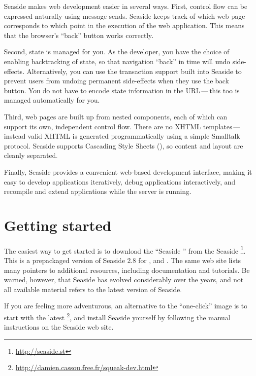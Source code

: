 \documentclass[a4paper,10pt,twoside]{book}
\begin{document}
Seaside makes web development easier in several ways.
First,  control flow can be expressed naturally using message sends.
Seaside keeps track of which web page corresponds to which point in the execution of the web application.
This means that the browser's ``back'' button works correctly.

Second, state is managed for you.
As the developer, you have the choice of enabling 
backtracking of state, so that navigation ``back'' in time will undo side-effects.
Alternatively, you can use the transaction support built into Seaside to prevent users from undoing permanent side-effects when they use the back button.
You do not have to encode state information in the URL\,---\,this too is managed automatically for you.

Third, web pages are built up from nested components, each of which can support its own, independent control flow.
There are no XHTML templates\,---\,instead valid XHTML is generated programmatically using a simple Smalltalk protocol.
Seaside supports Cascading Style Sheets (), so content and layout are cleanly separated.

Finally, Seaside provides a convenient web-based development interface, making it easy to develop applications iteratively, debug applications interactively, and recompile and extend applications while the server is running.

\section{Getting started}

The easiest way to get started is to download the ``Seaside '' from the Seaside \footnote{\url{http://seaside.st}}.
This is a prepackaged version of Seaside 2.8 for ,  and .
The same web site lists many pointers to additional resources, including documentation and tutorials.
Be warned, however, that Seaside has evolved considerably over the years, and not all available material refers to the latest version of Seaside.

If you are feeling more adventurous, an alternative to the ``one-click'' image is to start with the latest \footnote{\url{http://damien.cassou.free.fr/squeak-dev.html}}, and install Seaside yourself by following the manual  instructions on the Seaside web site.
\end{document}
